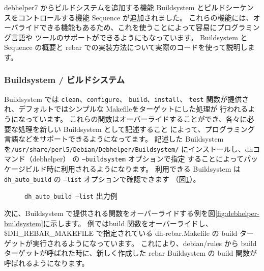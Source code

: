 \documentclass[mingoth,a4paper,twoside]{jsarticle}
\begin{document}
debhelper7 からビルドシステムを追加する機能 Buildsystem とビルドシーケンスをコントロールする機能
Sequence が追加されました。
これらの機能には、オーバライドできる機能もあるため、これを使うことによって容易にプログラミング言語や
ツールのサポートができるようにもなっています。
Buildsystem と Sequence の概要と rebar での実装方法について実際のコードを使って説明します。

\subsubsection{Buildsystem / ビルドシステム}

Buildsystem では \texttt{clean}、\texttt{configure}、 \texttt{build}、\texttt{install}、
\texttt{test} 関数が提供され、デフォルトではシンプルな Makefileをターゲットにした処理が
行われるようになっています。
これらの関数はオーバーライドすることができ、各々に必要な処理を新しい Buildsystem として記述すること
によって、プログラミング言語などをサポートできるようになってます。
記述した Buildsystem を\texttt{/usr/share/perl5/Debian/Debhelper/Buildsystem/}
にインストールし、dhコマンド（debhelper） の \texttt{--buildsystem} オプションで指定
することによってパッケージビルド時に利用されるようになります。
利用できる Buildsystem は \texttt{dh\_auto\_build} の \texttt{--list} オプションで確認できます
（図\ref{fig:debhelper-dhautobuild}）。

\begin{figure}[ht]
  \centering
{} %
 \caption{\texttt{dh\_auto\_build --list} 出力例}
 \label{fig:debhelper-dhautobuild}
 \vspace{-1.5em}
\end{figure}

次に、Buildsystem で提供される関数をオーバーライドする例を図\ref{fig:debhelper-buildsystem}に示します。
例ではbuild 関数をオーバーライドし、\$DH\_REBAR\_MAKEFILE で指定されている dh-rebar.Makefile
の build ターゲットが実行されるようになっています。
これにより、debian/rules から build ターゲットが呼ばれた時に、新しく作成した rebar Buildsystem
の build 関数が呼ばれるようになります。
\end{document}

